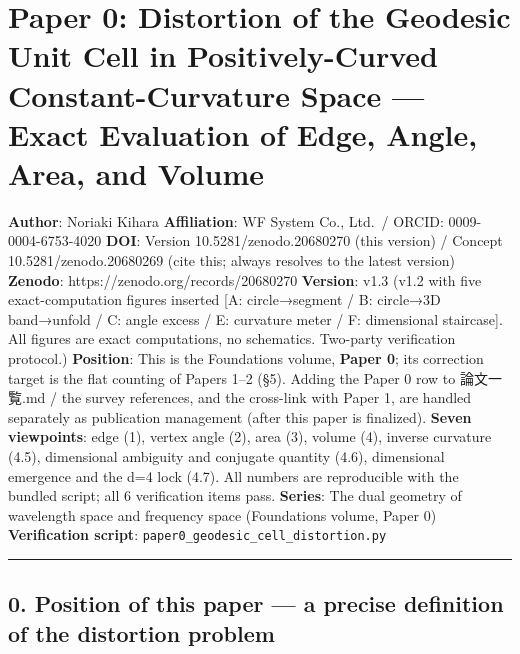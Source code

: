 \documentclass[
]{ltjsarticle}
\author{}
\date{}
\begin{document}
\section{Paper 0: Distortion of the Geodesic Unit Cell in
Positively-Curved Constant-Curvature Space --- Exact Evaluation of Edge,
Angle, Area, and
Volume}\label{paper-0-distortion-of-the-geodesic-unit-cell-in-positively-curved-constant-curvature-space-exact-evaluation-of-edge-angle-area-and-volume}

\textbf{Author}: Noriaki Kihara \textbf{Affiliation}: WF System Co.,
Ltd.~/ ORCID: 0009-0004-6753-4020 \textbf{DOI}: Version
10.5281/zenodo.20680270 (this version) / Concept 10.5281/zenodo.20680269
(cite this; always resolves to the latest version) \textbf{Zenodo}:
https://zenodo.org/records/20680270 \textbf{Version}: v1.3 (v1.2 with
five exact-computation figures inserted {[}A: circle→segment / B:
circle→3D band→unfold / C: angle excess / E: curvature meter / F:
dimensional staircase{]}. All figures are exact computations, no
schematics. Two-party verification protocol.) \textbf{Position}: This is
the Foundations volume, \textbf{Paper 0}; its correction target is the
flat counting of Papers 1--2 (§5). Adding the Paper 0 row to 論文一覧.md
/ the survey references, and the cross-link with Paper 1, are handled
separately as publication management (after this paper is finalized).
\textbf{Seven viewpoints}: edge (1), vertex angle (2), area (3), volume
(4), inverse curvature (4.5), dimensional ambiguity and conjugate
quantity (4.6), dimensional emergence and the d=4 lock (4.7). All
numbers are reproducible with the bundled script; all 6 verification
items pass. \textbf{Series}: The dual geometry of wavelength space and
frequency space (Foundations volume, Paper 0) \textbf{Verification
script}: \texttt{paper0\_geodesic\_cell\_distortion.py}

\begin{center}\rule{0.5\linewidth}{0.5pt}\end{center}

\subsection{0. Position of this paper --- a precise definition of the
distortion
problem}\label{position-of-this-paper-a-precise-definition-of-the-distortion-problem}
\end{document}
